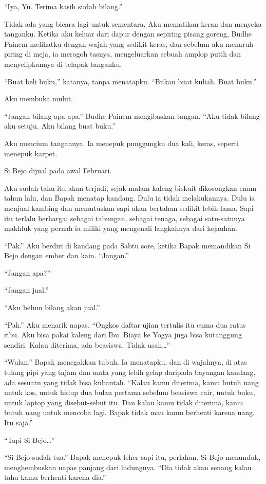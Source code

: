 \documentclass[11pt,twoside,openany]{book}
\makeatletter
\newcommand{\scenebreak}{\par\vspace{0.9em}{\centering\textsc{*\hspace{0.7em}*\hspace{0.7em}*}\par}\vspace{0.9em}\@afterindentfalse\@afterheading}
\makeatother
\begin{document}
``Iya, Yu. Terima kasih sudah bilang.''

Tidak ada yang bicara lagi untuk sementara. Aku mematikan keran dan menyeka tanganku. Ketika aku keluar dari dapur dengan sepiring pisang goreng, Budhe Painem melihatku dengan wajah yang sedikit keras, dan sebelum aku menaruh piring di meja, ia merogoh tasnya, mengeluarkan sebuah amplop putih dan menyelipkannya di telapak tanganku.

``Buat beli buku,'' katanya, tanpa menatapku. ``Bukan buat kuliah. Buat buku.''

Aku membuka mulut.

``Jangan bilang apa-apa.'' Budhe Painem mengibaskan tangan. ``Aku tidak bilang aku setuju. Aku bilang buat buku.''

Aku mencium tangannya. Ia menepuk punggungku dua kali, keras, seperti menepuk karpet.

\scenebreak
Si Bejo dijual pada awal Februari.

Aku sudah tahu itu akan terjadi, sejak malam kaleng biskuit dikosongkan enam tahun lalu, dan Bapak menatap kandang. Dulu ia tidak melakukannya. Dulu ia menjual kambing dan memutuskan sapi akan bertahan sedikit lebih lama. Sapi itu terlalu berharga: sebagai tabungan, sebagai tenaga, sebagai satu-satunya makhluk yang pernah ia miliki yang mengenali langkahnya dari kejauhan.

``Pak.'' Aku berdiri di kandang pada Sabtu sore, ketika Bapak memandikan Si Bejo dengan ember dan kain. ``Jangan.''

``Jangan apa?''

``Jangan jual.''

``Aku belum bilang akan jual.''

``Pak.'' Aku menarik napas. ``Ongkos daftar ujian tertulis itu cuma dua ratus ribu. Aku bisa pakai kaleng dari Ibu. Biaya ke Yogya juga bisa kutanggung sendiri. Kalau diterima, ada beasiswa. Tidak usah\ldots{}''

``Wulan.'' Bapak menegakkan tubuh. Ia menatapku, dan di wajahnya, di atas tulang pipi yang tajam dan mata yang lebih gelap daripada bayangan kandang, ada sesuatu yang tidak bisa kubantah. ``Kalau kamu diterima, kamu butuh uang untuk kos, untuk hidup dua bulan pertama sebelum beasiswa cair, untuk buku, untuk laptop yang disebut-sebut itu. Dan kalau kamu tidak diterima, kamu butuh uang untuk mencoba lagi. Bapak tidak mau kamu berhenti karena uang. Itu saja.''

``Tapi Si Bejo\ldots{}''

``Si Bejo sudah tua.'' Bapak menepuk leher sapi itu, perlahan. Si Bejo menunduk, menghembuskan napas panjang dari hidungnya. ``Dia tidak akan senang kalau tahu kamu berhenti karena dia.''
\end{document}

